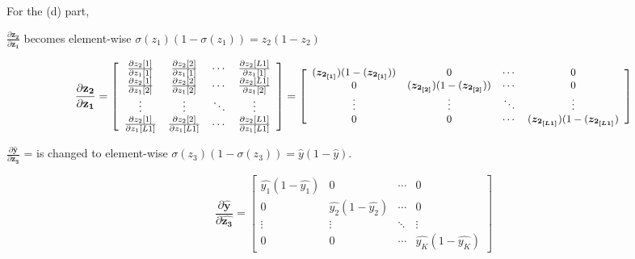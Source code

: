 

For the (d) part, 

$\frac{\partial \bm{z_2}}{\partial \bm{z_1}}$ becomes element-wise $\sigma({z_1}) (1 - \sigma({z_1})) = z_2 (1 - z_2)$


\begin{equation}
    \frac{\partial \mathbf{z_2}}{\partial \mathbf{z_1}}
    =
    \left[\begin{array}{cccc}
        \frac{\partial z_{2}{[1]}}{\partial z_{1}{[1]}} & \frac{\partial z_{2}{[2]}}{\partial z_{1}{[1]}} & \cdots & \frac{\partial z_{2}{[L1]}}{\partial z_{1}{[1]}} \\
        \frac{\partial z_{2}{[1]}}{\partial z_{1}{[2]}} & \frac{\partial z_{2}{[2]}}{\partial z_{1}{[2]}} & \cdots & \frac{\partial z_{2}{[L1]}}{\partial z_{1}{[2]}} \\
        \vdots & \vdots & \ddots & \vdots \\
        \frac{\partial z_{2}{[1]}}{\partial z_{1}{[L1]}} & \frac{\partial z_{2}{[2]}}{\partial z_{1}{[L1]}} & \cdots & \frac{\partial z_{2}{[L1]}}{\partial z_{1}{[L1]}}
    \end{array}\right]
    = 
    \left[
        \small
        \begin{array}{cccc}
            (\bm{z_{2_{[1]}}}) (1 - (\bm{z_{2_{[1]}}}))& 0 & \cdots & 0 \\
            0 & (\bm{z_{2_{[2]}}}) (1 - (\bm{z_{2_{[2]}}})) & \cdots & 0 \\
            \vdots & \vdots & \ddots & \vdots \\
            0 & 0 & \cdots & (\bm{z_{2_{[L1]}}}) (1 - (\bm{z_{2_{[L1]}}})
        \end{array}
    \right]
\end{equation}

    $\frac{\partial \bm{\hat y}}{\partial \bm{z_3}}$ = is changed to element-wise $\sigma({z_3}) (1 - \sigma({z_3})) = {\hat{y}}(1- {\hat y}) $.


    \begin{equation}
        \frac{\partial \mathbf{\hat{y}}}{\partial \mathbf{\hat{z_3}}}
        =
        \left[
            \begin{array}{cccc}
                { \hat{y_1}(1 - {\hat{y_1}}) } & 0 & \cdots & 0 \\
                0 & { \hat{y_2}(1 - {\hat{y_2}}) } & \cdots & 0 \\
                \vdots & \vdots & \ddots & \vdots \\
                0 & 0 & \cdots & { \hat{y_K}(1 - {\hat{y_K}}) }
            \end{array}
        \right]
    \end{equation}



